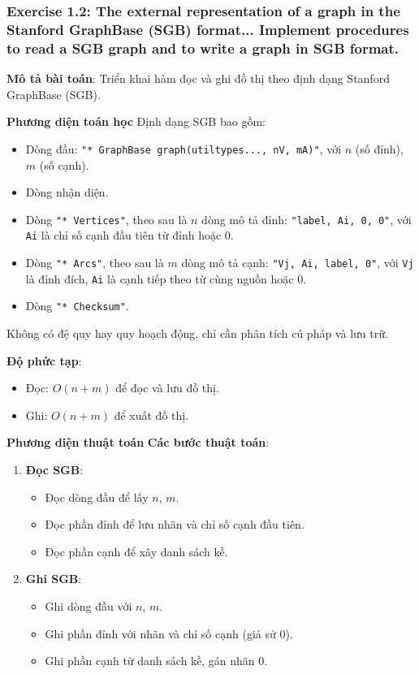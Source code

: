 \documentclass[a4paper,12pt]{article}
\begin{document}
\subsubsection{Exercise 1.2: The external representation of a graph in the Stanford GraphBase (SGB) format... Implement procedures to read a SGB graph and to write a graph in SGB format.}
\textbf{Mô tả bài toán}: Triển khai hàm đọc và ghi đồ thị theo định dạng Stanford GraphBase (SGB).

\textbf{Phương diện toán học}
Định dạng SGB bao gồm:
\begin{itemize}
    \item Dòng đầu: \texttt{"* GraphBase graph(utiltypes..., nV, mA)"}, với \( n \) (số đỉnh), \( m \) (số cạnh).
    \item Dòng nhận diện.
    \item Dòng \texttt{"* Vertices"}, theo sau là \( n \) dòng mô tả đỉnh: \texttt{"label, Ai, 0, 0"}, với \texttt{Ai} là chỉ số cạnh đầu tiên từ đỉnh hoặc 0.
    \item Dòng \texttt{"* Arcs"}, theo sau là \( m \) dòng mô tả cạnh: \texttt{"Vj, Ai, label, 0"}, với \texttt{Vj} là đỉnh đích, \texttt{Ai} là cạnh tiếp theo từ cùng nguồn hoặc 0.
    \item Dòng \texttt{"* Checksum"}.
\end{itemize}
Không có đệ quy hay quy hoạch động, chỉ cần phân tích cú pháp và lưu trữ.

\textbf{Độ phức tạp}:
\begin{itemize}
    \item Đọc: \( O(n + m) \) để đọc và lưu đồ thị.
    \item Ghi: \( O(n + m) \) để xuất đồ thị.
\end{itemize}

\textbf{Phương diện thuật toán}
\textbf{Các bước thuật toán}:
\begin{enumerate}
    \item \textbf{Đọc SGB}:
        \begin{itemize}
            \item Đọc dòng đầu để lấy \( n \), \( m \).
            \item Đọc phần đỉnh để lưu nhãn và chỉ số cạnh đầu tiên.
            \item Đọc phần cạnh để xây danh sách kề.
        \end{itemize}
    \item \textbf{Ghi SGB}:
        \begin{itemize}
            \item Ghi dòng đầu với \( n \), \( m \).
            \item Ghi phần đỉnh với nhãn và chỉ số cạnh (giả sử 0).
            \item Ghi phần cạnh từ danh sách kề, gán nhãn 0.
        \end{itemize}
\end{enumerate}
\end{document}
